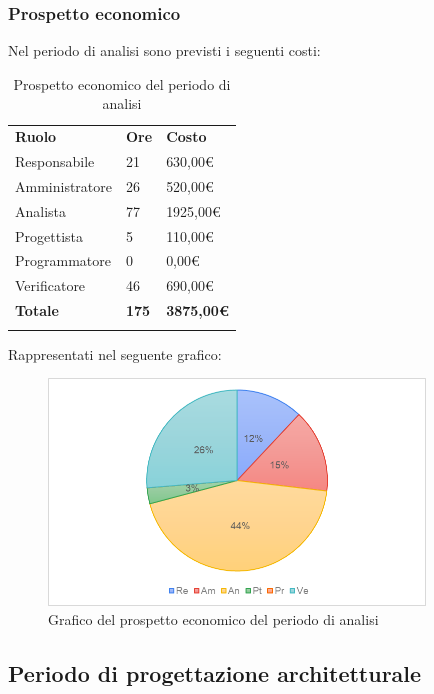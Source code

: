 		\subsubsection{Prospetto economico}
		Nel periodo di analisi sono previsti i seguenti costi:
		\begin{longtable} {
			>{}p{32mm}
			>{}p{20mm}
			>{}p{20mm}
		}
		\rowcolor{gray!50}
		
		\textbf{Ruolo} & \textbf{Ore} & \textbf{Costo} \TBstrut \\
		Responsabile & 21 & 630,00\euro{} \TBstrut \\
		Amministratore & 26 & 520,00\euro{} \TBstrut \\
		Analista & 77 & 1925,00\euro{} \TBstrut \\
		Progettista & 5 & 110,00\euro{} \TBstrut \\
		Programmatore & 0 & 0,00\euro{} \TBstrut \\
		Verificatore & 46 & 690,00\euro{} \TBstrut \\
		\textbf{Totale} & \textbf{175}& \textbf{3875,00\euro{}} \TBstrut \\
		\rowcolor{white}
		\caption{Prospetto economico del periodo di analisi}		
		\end{longtable}
		Rappresentati nel seguente grafico:
		\begin{figure} [H]
			\includegraphics[width=100mm]{./img/Grafici/2.png}
			\caption{Grafico del prospetto economico del periodo di analisi}
		\end{figure}
\subsection{Periodo di progettazione architetturale}
